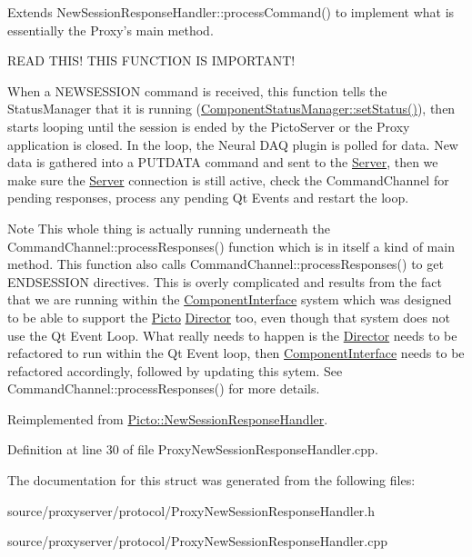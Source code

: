 Extends New\-Session\-Response\-Handler\-::process\-Command() to implement what is essentially the Proxy's main method. 

R\-E\-A\-D T\-H\-I\-S! T\-H\-I\-S F\-U\-N\-C\-T\-I\-O\-N I\-S I\-M\-P\-O\-R\-T\-A\-N\-T!

When a N\-E\-W\-S\-E\-S\-S\-I\-O\-N command is received, this function tells the Status\-Manager that it is running (\hyperlink{class_component_status_manager_a6b4219dc5a4105bd24b62d89861ee443}{Component\-Status\-Manager\-::set\-Status()}), then starts looping until the session is ended by the Picto\-Server or the Proxy application is closed. In the loop, the Neural D\-A\-Q plugin is polled for data. New data is gathered into a P\-U\-T\-D\-A\-T\-A command and sent to the \hyperlink{class_server}{Server}, then we make sure the \hyperlink{class_server}{Server} connection is still active, check the Command\-Channel for pending responses, process any pending Qt Events and restart the loop. \begin{DoxyNote}{Note}
This whole thing is actually running underneath the Command\-Channel\-::process\-Responses() function which is in itself a kind of main method. This function also calls Command\-Channel\-::process\-Responses() to get E\-N\-D\-S\-E\-S\-S\-I\-O\-N directives. This is overly complicated and results from the fact that we are running within the \hyperlink{class_component_interface}{Component\-Interface} system which was designed to be able to support the \hyperlink{namespace_picto}{Picto} \hyperlink{class_director}{Director} too, even though that system does not use the Qt Event Loop. What really needs to happen is the \hyperlink{class_director}{Director} needs to be refactored to run within the Qt Event loop, then \hyperlink{class_component_interface}{Component\-Interface} needs to be refactored accordingly, followed by updating this sytem. See Command\-Channel\-::process\-Responses() for more details. 
\end{DoxyNote}


Reimplemented from \hyperlink{struct_picto_1_1_new_session_response_handler_a67dfb302f5c8769f09d058aa01348d69}{Picto\-::\-New\-Session\-Response\-Handler}.



Definition at line 30 of file Proxy\-New\-Session\-Response\-Handler.\-cpp.



The documentation for this struct was generated from the following files\-:\begin{DoxyCompactItemize}
\item 
source/proxyserver/protocol/Proxy\-New\-Session\-Response\-Handler.\-h\item 
source/proxyserver/protocol/Proxy\-New\-Session\-Response\-Handler.\-cpp\end{DoxyCompactItemize}
